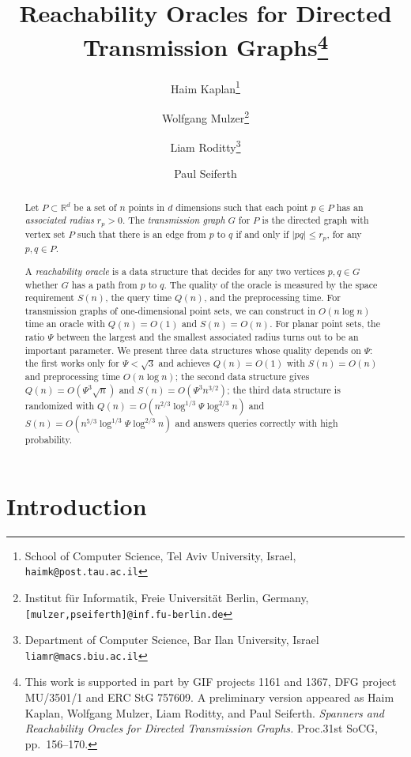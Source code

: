 \documentclass[11pt,a4paper]{paper}
\title{Reachability Oracles for Directed
  Transmission Graphs\footnote{ 
  This work is supported in part by GIF
  projects 1161 and 1367, DFG project MU/3501/1 and 
  ERC StG 757609.
  A preliminary version appeared as
  Haim Kaplan, Wolfgang Mulzer, Liam Roditty, and Paul Seiferth.
  \emph{Spanners and Reachability Oracles for Directed Transmission Graphs.}
  Proc.\@ 31st SoCG, pp.~156--170.}}
\author{Haim Kaplan\thanks{School of Computer Science, Tel Aviv University,
 Israel, \texttt{haimk@post.tau.ac.il}} \and
 Wolfgang Mulzer\thanks{Institut f\"ur Informatik,
Freie Universit\"at Berlin,
  Germany,
  \texttt{[mulzer,pseiferth]@inf.fu-berlin.de}} \and
Liam Roditty\thanks{Department of Computer Science, Bar Ilan University,
  Israel
  \texttt{liamr@macs.biu.ac.il}} \and
Paul Seiferth\footnotemark[3]}
\newcommand{\mathset}[1]{\ensuremath {\mathbb {#1}}}
\newcommand{\R}{\mathset{R}}
\begin{document}
\maketitle

\begin{abstract}
Let $P \subset \R^d$ be a set of $n$ points
in $d$ dimensions
such that each point $p \in P$ has an
\emph{associated radius} $r_p > 0$.
The \emph{transmission graph} $G$ for $P$ is the
directed graph with vertex set
$P$ such that there is
an edge from $p$ to $q$ if and only if
$|pq| \leq r_p$, for any $p, q \in P$.

A \emph{reachability oracle} is a data structure
that decides for any two vertices $p, q \in G$
whether $G$ has a path from $p$ to $q$.
The quality of the oracle is measured
by the space requirement $S(n)$,
the query time $Q(n)$, and the preprocessing time.
For transmission graphs of one-dimensional point sets, we 
can construct in $O(n \log n)$ time
an oracle with $Q(n) = O(1)$ and $S(n) = O(n)$.
For planar point sets, the ratio $\Psi$ between the largest and
the smallest associated radius turns out to be an important
parameter. We present three data
structures whose quality depends on $\Psi$:
the first works only for $\Psi < \sqrt{3}$ and achieves $Q(n) = O(1)$ with
$S(n) = O(n)$ and preprocessing time $O(n\log n)$;
the second data structure gives
$Q(n) = O(\Psi^3 \sqrt{n})$
 and $S(n) = O(\Psi^3 n^{3/2})$;
the third data structure is randomized with
$Q(n) = O(n^{2/3}\log^{1/3} \Psi \log^{2/3} n)$ and
$S(n) = O(n^{5/3}\log^{1/3} \Psi \log^{2/3} n)$
and answers queries correctly with high probability.
\end{abstract}

\section{Introduction}
\end{document}

